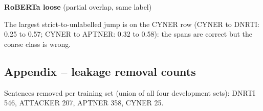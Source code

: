 \textbf{RoBERTa loose} (partial overlap, same label)


\begin{table}[h!]
\centering
{}%
\caption{RoBERTa loose span-F1 on each development dataset after training on each dataset.}
\label{tab:loose_span_f1_cross_dataset_roberta}
\end{table}

The largest strict-to-unlabelled jump is on the CYNER row (CYNER to DNRTI: 0.25 to 0.57; CYNER to APTNER: 0.32 to 0.58): the spans are correct but the coarse class is wrong.

\subsection*{Appendix -- leakage removal counts}

Sentences removed per training set (union of all four development sets): DNRTI 546, ATTACKER 207, APTNER 358, CYNER 25.
